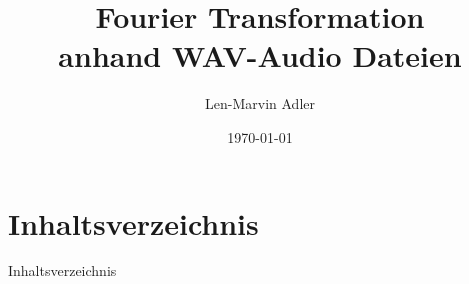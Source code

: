 \documentclass{beamer}
\title{Fourier Transformation \\ anhand WAV-Audio Dateien}
\author{Len-Marvin Adler}
\institute{Hochschule Bonn-Rhein-Sieg}
\date{\today}
\begin{document}
\frame{\titlepage}

\section*{Inhaltsverzeichnis}
\begin{frame}{Inhaltsverzeichnis}
	\tableofcontents
\end{frame}











\end{document}
